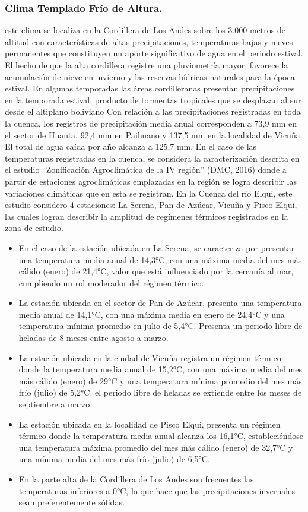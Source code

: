 \documentclass[11pt,]{article}
\begin{document}
		\subsubsection{Clima Templado Frío de Altura.}
este clima se localiza en la Cordillera de Los Andes sobre los 3.000 metros de altitud con características de altas precipitaciones, temperaturas bajas y nieves permanentes que constituyen un aporte significativo de agua en el periodo estival. El hecho de que la alta cordillera registre una pluviometría mayor, favorece la acumulación de nieve en invierno y las reservas hídricas naturales para la época estival. En algunas temporadas las áreas cordilleranas presentan precipitaciones en la temporada estival, producto de tormentas tropicales que se desplazan al sur desde el altiplano boliviano
Con relación a las precipitaciones registradas en toda la cuenca, los registros de precipitación media anual corresponden a 73,9 mm en el sector de Huanta, 92,4 mm en Paihuano y 137,5 mm en la localidad de Vicuña. El total de agua caída por año alcanza a 125,7 mm. 
En el caso de las temperaturas registradas en la cuenca, se considera la caracterización descrita  en el estudio “Zonificación Agroclimática de la IV región” (DMC, 2016) donde a partir de estaciones agroclimáticas emplazadas en la región se logra describir las variaciones climáticas que en esta se registran. En la Cuenca del río Elqui, este estudio considero 4 estaciones: La Serena, Pan de Azúcar, Vicuña y Pisco Elqui, las cuales logran describir la amplitud de regímenes térmicos registrados en la zona de estudio. 

\begin{itemize}
\item En el caso de la estación ubicada en La Serena, se caracteriza por presentar una temperatura media anual de 14,3°C, con una máxima media del mes más cálido (enero) de 21,4°C, valor que está influenciado por la cercanía al mar, cumpliendo un rol moderador del régimen térmico. 
\item La estación ubicada en el sector de Pan de Azúcar, presenta una temperatura media anual de 14,1°C, con una máxima media en enero de 24,4°C y una temperatura mínima promedio en julio de 5,4°C. Presenta un periodo libre de heladas de 8 meses entre agosto a marzo. 
\item La estación ubicada en la ciudad de Vicuña registra un régimen térmico donde la temperatura media anual de 15,2°C, con una máxima media del mes más cálido (enero) de 29°C y una temperatura mínima promedio del mes más frío (julio) de 5,2°C. el periodo libre de heladas se extiende entre los meses de septiembre a marzo.
\item La estación ubicada en la localidad de Pisco Elqui, presenta un régimen térmico donde la temperatura media anual alcanza los 16,1°C, estableciéndose una temperatura máxima promedio del mes más cálido (enero) de 32,7°C y una mínima media del mes más frío (julio) de 6,5°C.
\item En la parte alta de la Cordillera de Los Andes son frecuentes las temperaturas inferiores a 0°C, lo que hace que las precipitaciones invernales sean preferentemente sólidas.
\end{itemize}
\end{document}
